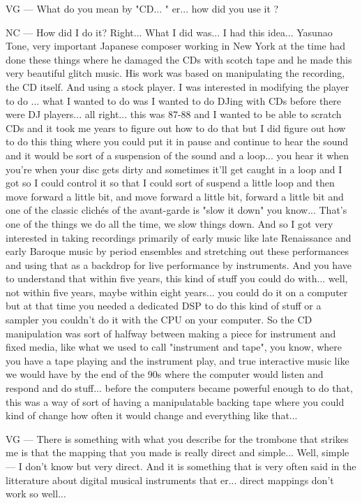 VG — What do you mean by "CD... "  er... how did you use it ? 

NC — How did I do it? Right... What I did was... I had this idea... Yasunao Tone, very important Japanese composer working in New York at the time had done these things where he damaged the CDs with scotch tape and he made this very beautiful glitch music. His work was based on manipulating the recording, the CD itself. And using a stock player. I was interested in modifying the player to do ... what I wanted to do was I wanted to do DJing with CDs before there were DJ players... all right... this was 87-88 and I wanted to be able to scratch CDs and it took me years to figure out how to do that but I did figure out how to do this thing where you could put it in pause and continue to hear the sound and it would be sort of a suspension of the sound and a loop... you hear it when you're when your disc gets dirty and sometimes it'll get caught in a loop and I got so I could control it so that I could sort of suspend a little loop and then move forward a little bit, and move forward a little bit, forward a little bit and one of the classic clichés of the avant-garde is "slow it down" you know... That's one of the things we do all the time, we slow things down. And so I got very interested in taking recordings primarily of early music like late Renaissance and early Baroque music by period ensembles and stretching out these performances and using that as a backdrop for live performance by instruments. And you have to understand that within five years, this kind of stuff you could do with... well, not within five years, maybe within eight years... you could do it on a computer but at that time you needed a dedicated DSP to do this kind of stuff or a sampler you couldn't do it with the CPU on your computer. So the CD manipulation was sort of halfway between making a piece for instrument and fixed media, like what we used to call "instrument and tape", you know, where you have a tape playing and the instrument play, and true interactive music like we would have by the end of the 90s where the computer would listen and respond and do stuff... before the computers became powerful enough to do that, this was a way of sort of having a manipulatable backing tape where you could kind of change how often it would change and everything like that... 

VG — There is something with what you describe for the trombone that strikes me is that the mapping that you made is really direct and simple... Well, simple — I don't know but very direct. And it is something that is very often said in the litterature about digital musical instruments that er... direct mappings don't work so well... 

